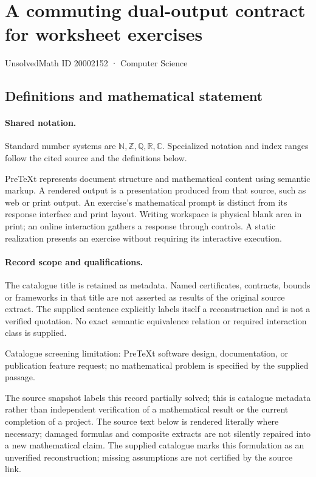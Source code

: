 \documentclass[11pt]{article}
\begin{document}
\setcounter{section}{20002151}
\section{A commuting dual-output contract for worksheet exercises}\label{20002152}
{\small\sffamily UnsolvedMath ID 20002152 · Computer Science}
\subsection{Definitions and mathematical statement}

\paragraph{Shared notation.}Standard number systems are $\mathbb N,\mathbb Z,\mathbb Q,\mathbb R,\mathbb C$. Specialized notation and index ranges follow the cited source and the definitions below.


PreTeXt represents document structure and mathematical content using semantic markup. A rendered output is a presentation produced from that source, such as web or print output. An exercise's mathematical prompt is distinct from its response interface and print layout. Writing workspace is physical blank area in print; an online interaction gathers a response through controls. A static realization presents an exercise without requiring its interactive execution.
\paragraph{Record scope and qualifications.}
The catalogue title is retained as metadata. Named certificates, contracts, bounds or frameworks in that title are not asserted as results of the original source extract.
The supplied sentence explicitly labels itself a reconstruction and is not a verified quotation. No exact semantic equivalence relation or required interaction class is supplied.

Catalogue screening limitation: PreTeXt software design, documentation, or publication feature request; no mathematical problem is specified by the supplied passage.

The source snapshot labels this record partially solved; this is catalogue metadata rather than independent verification of a mathematical result or the current completion of a project.
The source text below is rendered literally where necessary; damaged formulas and composite extracts are not silently repaired into a new mathematical claim.
The supplied catalogue marks this formulation as an unverified reconstruction; missing assumptions are not certified by the source link.
\end{document}
